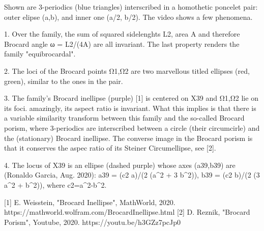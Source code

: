 Shown are 3-periodics (blue triangles) interscribed in a homothetic poncelet pair: outer elipse (a,b), and inner one (a/2, b/2). The video shows a few phenomena.

1. Over the family, the sum of squared sidelenghts L2, area A and therefore Brocard angle ω = L2/(4A) are all invariant. The last property renders the family "equibrocardal".

2. The loci of the Brocard points Ω1,Ω2 are two marvellous titled ellipses (red, green), similar to the ones in the pair.

3. The family's Brocard inellipse (purple) [1] is centered on X39 and  Ω1,Ω2 lie on its foci. amazingly, its aspect ratio is invariant. What this implies is that there is a variable similarity transform between this family and the so-called Brocard porism, where 3-periodics are interscribed between a circle (their circumcirle) and the (stationary) Brocard inellipse. The converse image in the Brocard porism is that it conserves the aspec ratio of its Steiner Circumellipse, see [2].

4. The locus of X39 is an ellipse (dashed purple) whose axes (a39,b39) are (Ronaldo Garcia, Aug. 2020): a39 = (c2 a)/(2 (a^2 + 3 b^2)), b39 = (c2 b)/(2 (3 a^2 + b^2)), where c2=a^2-b^2.

[1] E. Weisstein, "Brocard Inellipse", MathWorld, 2020. https://mathworld.wolfram.com/BrocardInellipse.html 
[2] D. Reznik, "Brocard Porism", Youtube, 2020. https://youtu.be/h3GZz7pcJp0
